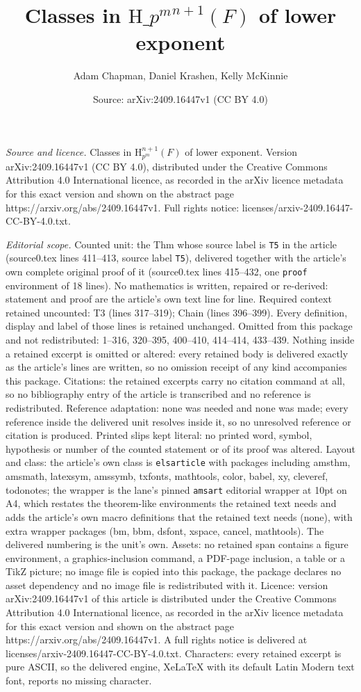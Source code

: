 \documentclass[10pt,a4paper]{amsart}
\title[Classes in $\mathrm H\_{p^m}^{n+1}(F)$ of lower exponent]{Classes in $\mathrm H\_{p^m}^{n+1}(F)$ of lower exponent}
\author{Adam Chapman, Daniel Krashen, Kelly McKinnie}
\date{Source: arXiv:2409.16447v1 (CC BY 4.0)}
\begin{document}
\maketitle

\noindent\emph{Source and licence.} Classes in $\mathrm H_{p^m}^{n+1}(F)$ of lower exponent. Version arXiv:2409.16447v1 (CC BY 4.0), distributed under the Creative Commons Attribution 4.0 International licence, as recorded in the arXiv licence metadata for this exact version and shown on the abstract page https://arxiv.org/abs/2409.16447v1. Full rights notice: licenses/arxiv-2409.16447-CC-BY-4.0.txt.\par\smallskip

\noindent\textit{Editorial scope.} Counted unit: the Thm whose source label is \texttt{T5} in the article (source0.tex lines 411--413, source label \texttt{T5}), delivered together with the article's own complete original proof of it (source0.tex lines 415--432, one \texttt{proof} environment of 18 lines). No mathematics is written, repaired or re-derived: statement and proof are the article's own text line for line. Required context retained uncounted: T3 (lines 317--319); Chain (lines 396--399). Every definition, display and label of those lines is retained unchanged. Omitted from this package and not redistributed: 1--316, 320--395, 400--410, 414--414, 433--439. Nothing inside a retained excerpt is omitted or altered: every retained body is delivered exactly as the article's lines are written, so no omission receipt of any kind accompanies this package. Citations: the retained excerpts carry no citation command at all, so no bibliography entry of the article is transcribed and no reference is redistributed. Reference adaptation: none was needed and none was made; every reference inside the delivered unit resolves inside it, so no unresolved reference or citation is produced. Printed slips kept literal: no printed word, symbol, hypothesis or number of the counted statement or of its proof was altered. Layout and class: the article's own class is \texttt{elsarticle} with packages including amsthm, amsmath, latexsym, amssymb, txfonts, mathtools, color, babel, xy, cleveref, todonotes; the wrapper is the lane's pinned \texttt{amsart} editorial wrapper at 10pt on A4, which restates the theorem-like environments the retained text needs and adds the article's own macro definitions that the retained text needs (none), with extra wrapper packages (bm, bbm, dsfont, xspace, cancel, mathtools). The delivered numbering is the unit's own. Assets: no retained span contains a figure environment, a graphics-inclusion command, a PDF-page inclusion, a table or a TikZ picture; no image file is copied into this package, the package declares no asset dependency and no image file is redistributed with it. Licence: version arXiv:2409.16447v1 of this article is distributed under the Creative Commons Attribution 4.0 International licence, as recorded in the arXiv licence metadata for this exact version and shown on the abstract page https://arxiv.org/abs/2409.16447v1. A full rights notice is delivered at licenses/arxiv-2409.16447-CC-BY-4.0.txt. Characters: every retained excerpt is pure ASCII, so the delivered engine, XeLaTeX with its default Latin Modern text font, reports no missing character.
\end{document}
